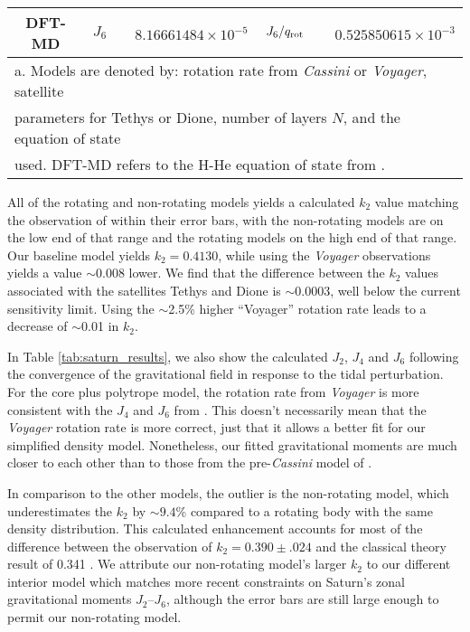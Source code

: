\begin{table}
\begin{tabular}{ccrcr}
 {DFT-MD}                   &  $J_6$     &  $8.16661484\times10^{-5}      $  &  $J_6/q_{\rm  rot}$  &  $0.525850615\times10^{-3}     $  \\
\hline
\multicolumn{5}{l}{a. Models are denoted by: rotation rate from \textit{Cassini} or \textit{Voyager}, satellite}\\
\multicolumn{5}{l}{parameters for Tethys or Dione, number of layers $N$, and the equation of state } \\
\multicolumn{5}{l}{used. DFT-MD refers to the H-He equation of state from \citet{hubbard2016}.}
\end{tabular}
\end{table}

All of the rotating and non-rotating models yields a calculated $k_2$ value matching
the observation of \citet{lainey2016} within their error bars, with the non-rotating
models are on the low end of that range and the rotating models on the high end of
that range. Our baseline model yields $k_2=0.4130$, while using the \textit{Voyager}
observations yields a value $\sim$0.008 lower. We find that the difference between
the $k_2$ values associated with the satellites Tethys and Dione is $\sim$0.0003,
well below the current sensitivity limit. Using the $\sim$2.5\% higher ``Voyager''
rotation rate leads to a decrease of $\sim$0.01 in $k_2$. 

In Table \ref{tab:saturn_results}, we also show the calculated $J_2$, $J_4$ and $J_6$
following the convergence of the gravitational field in response to the tidal
perturbation. For the core plus polytrope model, the rotation rate from
\textit{Voyager} is more consistent with the $J_4$ and $J_6$ from
\citet{Jacobson2006}. This doesn't necessarily mean that the \textit{Voyager}
rotation rate is more correct, just that it allows a better fit for our simplified
density model. Nonetheless, our fitted gravitational moments are much closer to each
other than to those from the pre-\textit{Cassini} model of \citet{gavrilov1977}.

In comparison to the other models, the outlier is the non-rotating model, which
underestimates the $k_2$ by $\sim9.4$\% compared to a rotating body with the same
density distribution.  This calculated enhancement accounts for most of the
difference between the observation of $k_2=0.390 \pm .024$ \citep{lainey2016} and the
classical theory result of 0.341 \citep{gavrilov1977}. We attribute our non-rotating
model's larger $k_2$ to our different interior model which matches more recent
constraints on Saturn's zonal gravitational moments $J_2$--$J_6$, although the
\citet{lainey2016} error bars are still large enough to permit our non-rotating
model.

